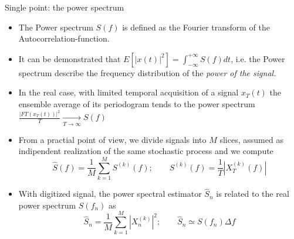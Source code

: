 \documentclass[t,10pt]{beamer}
\begin{document}
\begin{frame}{Single point: the power spectrum}
\begin{itemize}[<+->]
\item The \textcolor{ta3skyblue}{Power spectrum $S(f)$} is defined as the
  Fourier transform of the Autocorrelation-function.
\item It can be demonstrated that
  $E[|x(t)|^2]=\int_{-\infty}^{+\infty}S(f)dt$, i.e. the Power
  spectrum describe the frequency distribution of the \emph{power of
    the signal.}
\item In the real case, with limited temporal acquisition of a signal $x_T(t)$
  the ensemble average of its \textcolor{ta3skyblue}{periodogram}
  tends to the power spectrum
  $\frac{|FT(x_T(t))|^2}{T}\xrightarrow[T\rightarrow \infty]{} S(f)$
\item From a practial point of view, we divide
  signals into $M$ slices, assumed as indipendent realization of the
  same stochastic process and we compute
\begin{equation*}
\hat{S}(f) = \frac{1}{M}\sum_{k=1}^{M} S^{(k)}(f) ; \qquad S^{(k)}(f)=\frac{1}{T}|X_T^{(k)}(f)|
\end{equation*}
\item With digitized signal, the power spectral estimator $\hat{S}_n$
  is related to the real power spectrum $S(f_n)$ as 
\begin{equation*}
\hat{S}_n = \frac{1}{M}\sum_{k=1}^{M}|X_n^{(k)}|^2; \qquad \hat{S}_n
\simeq S(f_n)\Delta f
\end{equation*}
\end{itemize}
\end{frame}
\end{document}
